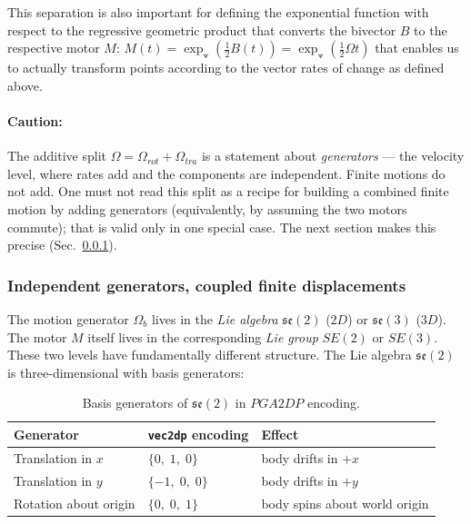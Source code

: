 This separation is also important for defining the exponential function with respect to
the regressive geometric product that converts the bivector $B$ to the respective motor
$M$: $M(t) = \exp_{\veedot}(\frac{1}{2} B(t)) = \exp_{\veedot}(\frac{1}{2} \Omega t)$ that
enables us to actually transform points according to the vector rates of change as defined
above.

\paragraph{Caution:} The additive split $\Omega = \Omega_{rot} + \Omega_{tra}$ is a
statement
about \emph{generators} --- the velocity level, where rates add and the components are
independent. Finite motions do not add. One must not read this split as a recipe for
building a combined finite motion by adding generators (equivalently, by assuming the two
motors commute); that is valid only in one special case. The next section makes this
precise (Sec.~\ref{subsubsection_lie_algebra_vs_lie_group}).


\newpage

\subsubsection{Independent generators, coupled finite displacements}
\label{subsubsection_lie_algebra_vs_lie_group}

The motion generator $\Omega_b$ lives in the \emph{Lie algebra} $\mathfrak{se}(2)$ ($2D$)
or $\mathfrak{se}(3)$ ($3D$). The motor $M$ itself lives in the corresponding \emph{Lie
group} $SE(2)$ or $SE(3)$. These two levels have fundamentally different structure. The
Lie algebra $\mathfrak{se}(2)$ is three-dimensional with basis generators:

\begin{table}[!ht]
\centering\small
\begin{tabular}{l|l|l}
\hline
Generator & \texttt{vec2dp} encoding & Effect \\
\hline
Translation in $x$ & $\{0,\;1,\;0\}$ & body drifts in $+x$ \\
Translation in $y$ & $\{-1,\;0,\;0\}$ & body drifts in $+y$ \\
Rotation about origin & $\{0,\;0,\;1\}$ & body spins about world origin \\
\hline
\end{tabular}
\caption{Basis generators of $\mathfrak{se}(2)$ in $PGA2DP$ encoding.}
\label{tab:lie_generators_2dp}
\end{table}

